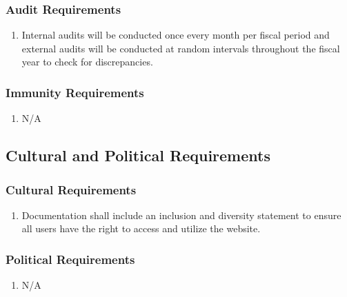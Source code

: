 \documentclass[]{article}
\begin{document}
\subsubsection{Audit Requirements}
\label{ssub:audit_requirements}
\begin{enumerate}[{SR-AU}1. ]
	\item Internal audits will be conducted once every month per fiscal period and external audits will be conducted at random intervals throughout the fiscal year to check for discrepancies.
\end{enumerate}

\subsubsection{Immunity Requirements}
\label{ssub:immunity_requirements}
\begin{enumerate}[{SR-IM}1. ]
	\item N/A
\end{enumerate}


\subsection{Cultural and Political Requirements}
\label{sub:cultural_and_political_requirements}

\subsubsection{Cultural Requirements}
\label{ssub:cultural_requirements}
\begin{enumerate}[{CP-C}1. ]
	\item Documentation shall include an inclusion and diversity statement to ensure all users have the right to access and utilize the website.
\end{enumerate}

\subsubsection{Political Requirements}
\label{ssub:political_requirements}
\begin{enumerate}[{CP-P}1. ]
	\item N/A
\end{enumerate}
\end{document}
